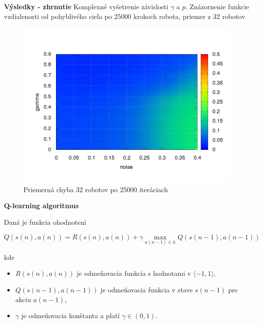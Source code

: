 \documentclass[xcolor=dvipsnames]{beamer}
\begin{document}
\begin{frame}{\bf Výsledky - zhrnutie}
Komplexné vyšetrenie závislosti $\gamma$ a $p$. Znázornenie funkcie vzdialenosti od pohyblivého cieľa po 25000 krokoch robota, priemer z 32 robotov

\begin{figure}[!htb]
\centering
\includegraphics[scale=.35]{../../results_q_learning/nano_q_learning/summary_result_average_error_map.png}
\caption{Priemerná chyba 32 robotov po 25000 iteráciach}
\label{img:nano_q_summary}
\end{figure}

\end{frame}








\begin{frame}{\bf Q-learning algoritmus}

Daná je funkcia ohodnotení

\begin{equation}
Q(s(n),a(n)) = R(s(n),a(n)) + \gamma \max_{a(n-1) \in \mathbb{A}} Q(s(n-1), a(n-1)) \nonumber
\end{equation}

kde \\

\begin{itemize}
 \item $R(s(n),a(n))$ je odmeňovacia funkcia s hodnotami v $\langle -1, 1 \rangle$, \\
 \item $Q(s(n-1),a(n-1))$ je odmeňovacia funkcia v stave $s(n-1)$ pre akciu $a(n-1)$, \\
 \item $\gamma$ je odmeňovacia konštanta a platí $\gamma \in (0, 1)$.
\end{itemize}

\end{frame}
\end{document}
